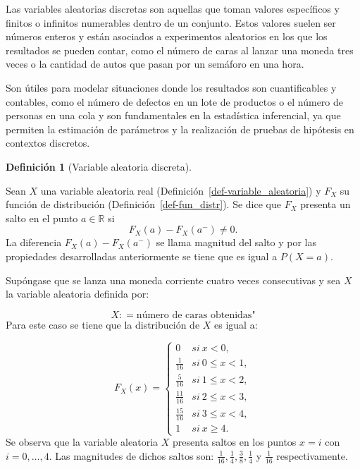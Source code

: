 \documentclass[
  us-letterpaper,
]{scrreprt}
\theoremstyle{plain}
\theoremstyle{plain}
\theoremstyle{definition}
\newtheorem{definition}{Definición}[chapter]
\theoremstyle{remark}
\begin{document}
Las variables aleatorias discretas son aquellas que toman valores
específicos y finitos o infinitos numerables dentro de un conjunto.
Estos valores suelen ser números enteros y están asociados a
experimentos aleatorios en los que los resultados se pueden contar, como
el número de caras al lanzar una moneda tres veces o la cantidad de
autos que pasan por un semáforo en una hora.

Son útiles para modelar situaciones donde los resultados son
cuantificables y contables, como el número de defectos en un lote de
productos o el número de personas en una cola y son fundamentales en la
estadística inferencial, ya que permiten la estimación de parámetros y
la realización de pruebas de hipótesis en contextos discretos.

\begin{definition}[Variable aleatoria
discreta]\protect\hypertarget{def-var_ale_dis}{}\label{def-var_ale_dis}

Sean \(X\) una variable aleatoria real
(Definición~\ref{def-variable_aleatoria}) y \(F_X\) su función de
distribución (Definición~\ref{def-fun_distr}). Se dice que \(F_X\)
presenta un salto en el punto \(a \in \mathbb{R}\) si
\[ F_{X}(a) - F_{X}(a^{-}) \neq 0.\] La diferencia
\(F_{X}(a) - F_{X}(a^{-})\) se llama magnitud del salto y por las
propiedades desarrolladas anteriormente se tiene que es igual a
\(P(X=a).\)

\end{definition}

\begin{tcolorbox}[enhanced jigsaw, titlerule=0mm, opacityback=0, coltitle=black, bottomrule=.15mm, colbacktitle=quarto-callout-caution-color!10!white, toprule=.15mm, colback=white, arc=.35mm, colframe=quarto-callout-caution-color-frame, leftrule=.75mm, bottomtitle=1mm, left=2mm, toptitle=1mm, opacitybacktitle=0.6, breakable, title={Ejemplo (\textbf{\emph{Variable aleatoria discreta}})}, rightrule=.15mm]

Supóngase que se lanza una moneda corriente cuatro veces consecutivas y
sea \(X\) la variable aleatoria definida por:

\[
X : = \text{número de caras obtenidas"}
\] Para este caso se tiene que la distribución de \(X\) es igual a:

\[
F_X(x)= \left\{ \begin{array}{lcc} 0 & si \ x< 0, \\  \frac{1}{16} & si \ 0\leq x<1, \\ \frac{5}{16} & si \ 1\leq x <2,\\ \frac{11}{16} & si \ 2\leq x<3, \\ \frac{15}{16} & si \ 3\leq x <4, \\ 1 & si \ x\geq 4. \end{array} \right.
\]Se observa que la variable aleatoria \(X\) presenta saltos en los
puntos \(x=i\) con \(i = 0,\dots , 4\). Las magnitudes de dichos saltos
son: \(\frac{1}{16}, \frac{1}{4}, \frac{3}{8}, \frac{1}{4}\) y
\(\frac{1}{16}\) respectivamente.

\end{tcolorbox}
\end{document}
